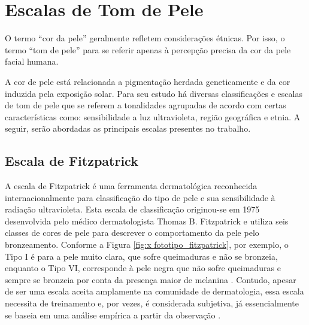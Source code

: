 \section{Escalas de Tom de Pele}
O termo “cor da pele” geralmente refletem considerações étnicas. Por isso, o termo “tom de pele” para se  referir apenas à percepção precisa da cor da pele facial humana\cite{Color_criteria_of_facial_skin_tone_judgment}.

A cor de pele está relacionada a pigmentação herdada geneticamente e da cor induzida pela exposição solar. Para seu estudo há diversas classificações e escalas de tom de pele que se referem a tonalidades agrupadas de acordo com certas características como: sensibilidade a luz ultravioleta, região geográfica e etnia. A seguir, serão abordadas as principais escalas presentes no trabalho.


\subsection{Escala de Fitzpatrick}
A escala de Fitzpatrick é uma ferramenta dermatológica reconhecida internacionalmente para classificação do tipo de pele e sua sensibilidade à radiação ultravioleta. Esta escala de classificação originou-se em 1975 desenvolvida pelo médico dermatologista Thomas B. Fitzpatrick e  utiliza seis classes de cores de pele para descrever o comportamento da pele pelo bronzeamento. Conforme a Figura \ref{fig:x fototipo_fitzpatrick},  por exemplo,  o  Tipo  I  é  para  a  pele  muito  clara, que sofre queimaduras e não se  bronzeia, enquanto   o   Tipo   VI,   corresponde   à pele negra que  não sofre queimaduras  e  sempre  se bronzeia por conta da presença maior de melanina \cite{Fitzpatrick_1988}. Contudo, apesar de ser uma escala aceita amplamente na comunidade de dermatologia, essa escala necessita de treinamento e, por vezes, é considerada subjetiva, já essencialmente se baseia em uma análise empírica a partir da observação \cite{Classificao_de_fototipos_de_pele}.

